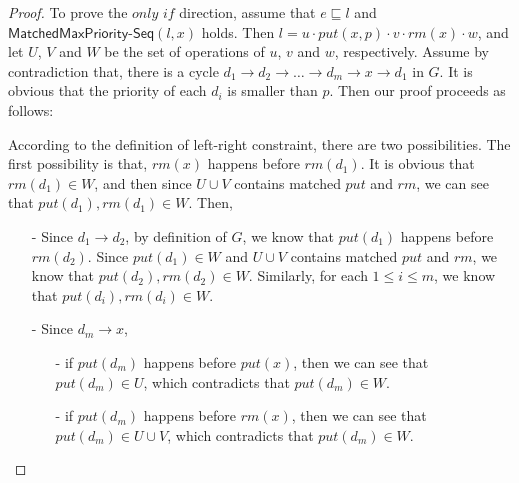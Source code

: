 \begin {proof}

To prove the $\textit{only if}$ direction, assume that $e \sqsubseteq l$ and $\mathsf{MatchedMaxPriority\text{-}Seq}(l,x)$ holds. Then $l = u \cdot \textit{put}(x,p) \cdot v \cdot \textit{rm}(x) \cdot w$, and let $U$, $V$ and $W$ be the set of operations of $u$, $v$ and $w$, respectively. Assume by contradiction that, there is a cycle $d_1 \rightarrow d_2 \rightarrow \ldots \rightarrow d_m \rightarrow x \rightarrow d_1$ in $G$. It is obvious that the priority of each $d_i$ is smaller than $p$. Then our proof proceeds as follows:

According to the definition of left-right constraint, there are two possibilities. The first possibility is that, $\textit{rm}(x)$ happens before $\textit{rm}(d_1)$. It is obvious that $\textit{rm}(d_1) \in W$, and then since $U \cup V$ contains matched $\textit{put}$ and $\textit{rm}$, we can see that $\textit{put}(d_1),\textit{rm}(d_1) \in W$. Then,

\begin{itemize}
\setlength{\itemsep}{0.5pt}
\item[-] Since $d_1 \rightarrow d_2$, by definition of $G$, we know that $\textit{put}(d_1)$ happens before $\textit{rm}(d_2)$. Since $\textit{put}(d_1) \in W$ and $U \cup V$ contains matched $\textit{put}$ and $\textit{rm}$, we know that $\textit{put}(d_2),\textit{rm}(d_2) \in W$. Similarly, for each $1 \leq i \leq m$, we know that $\textit{put}(d_i),\textit{rm}(d_i) \in W$.

\item[-] Since $d_m \rightarrow x$,
    \begin{itemize}
    \setlength{\itemsep}{0.5pt}
    \item[-] if $\textit{put}(d_m)$ happens before $\textit{put}(x)$, then we can see that $\textit{put}(d_m) \in U$, which contradicts that $\textit{put}(d_m) \in W$.

    \item[-] if $\textit{put}(d_m)$ happens before $\textit{rm}(x)$, then we can see that $\textit{put}(d_m) \in U \cup V$, which contradicts that $\textit{put}(d_m) \in W$.
    \end{itemize}
\end{itemize}


\end{proof}
